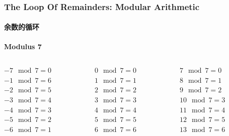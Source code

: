 \documentclass[
	11pt, %
]{beamer}
\begin{document}
\begin{frame}
	\frametitle{The Loop Of Remainders: Modular Arithmetic}
	\framesubtitle{余数的循环}
	\textbf{Modulus 7}

		\begin{columns}[t] %
		\begin{column}{0.3\textwidth} %
		$-7 \mod 7 = 0$ \\
		$-1 \mod 7 = 6$ \\
		$-2 \mod 7 = 5$ \\
		$-3 \mod 7 = 4$ \\
		$-4 \mod 7 = 3$ \\
		$-5 \mod 7 = 2$ \\
		$-6 \mod 7 = 1$ \\
		\end{column}
		\begin{column}{0.3\textwidth} %
		$0 \mod 7 = 0$ \\
		$1 \mod 7 = 1$ \\
		$2 \mod 7 = 2$ \\
		$3 \mod 7 = 3$ \\
		$4 \mod 7 = 4$ \\
		$5 \mod 7 = 5$ \\
		$6 \mod 7 = 6$ \\
		\end{column}

		\begin{column}{0.3\textwidth} %
		$7 \mod 7 = 0$ \\
		$8 \mod 7 = 1$ \\
		$9 \mod 7 = 2$ \\
		$10 \mod 7 = 3$ \\
		$11 \mod 7 = 4$ \\
		$12 \mod 7 = 5$ \\
		$13 \mod 7 = 6$ \\
		\end{column}
	\end{columns}
\end{frame}

\end{document}
